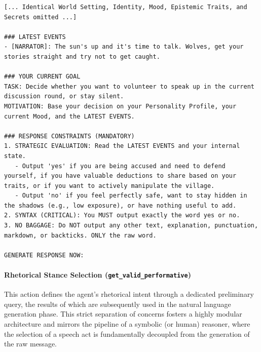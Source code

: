 \begin{lstlisting}[frame=single, basicstyle=\scriptsize\ttfamily, breaklines=true, caption={Cropped prompt for the \texttt{decide\_to\_speak} action, forcing a strict binary decision to manage discussion flow.}, label={lst:decide_to_speak}]
[... Identical World Setting, Identity, Mood, Epistemic Traits, and Secrets omitted ...]

### LATEST EVENTS
- [NARRATOR]: The sun's up and it's time to talk. Wolves, get your stories straight and try not to get caught.

### YOUR CURRENT GOAL
TASK: Decide whether you want to volunteer to speak up in the current discussion round, or stay silent.
MOTIVATION: Base your decision on your Personality Profile, your current Mood, and the LATEST EVENTS.

### RESPONSE CONSTRAINTS (MANDATORY)
1. STRATEGIC EVALUATION: Read the LATEST EVENTS and your internal state.
   - Output 'yes' if you are being accused and need to defend yourself, if you have valuable deductions to share based on your traits, or if you want to actively manipulate the village.
   - Output 'no' if you feel perfectly safe, want to stay hidden in the shadows (e.g., low exposure), or have nothing useful to add.
2. SYNTAX (CRITICAL): You MUST output exactly the word yes or no.
3. NO BAGGAGE: Do NOT output any other text, explanation, punctuation, markdown, or backticks. ONLY the raw word.

GENERATE RESPONSE NOW:
\end{lstlisting}

\paragraph{\textbf{Rhetorical Stance Selection (\texttt{get\_valid\_performative})}}
This action defines the agent's rhetorical intent through a dedicated preliminary query, the results of which are subsequently used in the natural language generation phase. This strict separation of concerns fosters a highly modular architecture and mirrors the pipeline of a symbolic (or human) reasoner, where the selection of a speech act is fundamentally decoupled from the generation of the raw message.

